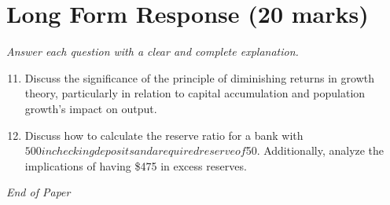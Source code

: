 \documentclass[12pt]{article}
\begin{document}
\section*{Long Form Response (20 marks)}
\textit{Answer each question with a clear and complete explanation.}
\begin{enumerate}[label=\arabic*.]
\setcounter{enumi}{10}
\item Discuss the significance of the principle of diminishing returns in growth theory, particularly in relation to capital accumulation and population growth's impact on output.
\item Discuss how to calculate the reserve ratio for a bank with $500 in checking deposits and a required reserve of $50. Additionally, analyze the implications of having \$475 in excess reserves.
\end{enumerate}

\vfill
\noindent\textit{End of Paper}
\end{document}
